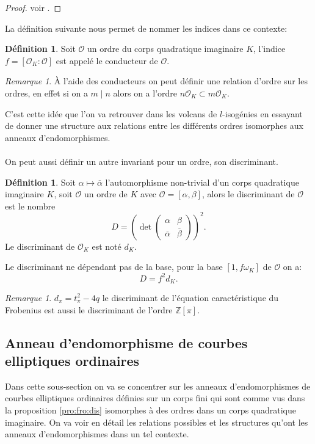 \documentclass[10pt,a4paper]{book}
\theoremstyle{plain}
\theoremstyle{definition}
\theoremstyle{definition}
\theoremstyle{definition}
\theoremstyle{definition}
\newtheorem{defi}[thm]{Définition}
\theoremstyle{remark}
\newtheorem{rem}[thm]{Remarque}
\theoremstyle{remark}
\theoremstyle{definition}
\begin{document}
\begin{proof}
voir \cite[lemma 7.7.2]{Cox89}.
\end{proof}

La définition suivante nous permet de nommer les indices dans ce contexte:
\begin{defi}
Soit $\mathcal{O}$ un ordre du corps quadratique imaginaire $K$, l'indice $f=[\mathcal{O}_K : \mathcal{O}]$ est appelé le conducteur de $\mathcal{O}$.
\end{defi}

\begin{rem}
\`A l'aide des conducteurs on peut définir une relation d'ordre sur les ordres, en effet si on a $m \mid n$ alors on a l'ordre $n\mathcal{O}_K \subset m\mathcal{O}_K$.
\end{rem}

C'est cette idée que l'on va retrouver dans les volcans de $l$-isogénies en essayant de donner une structure aux relations entre les différents ordres isomorphes aux anneaux d'endomorphismes.
\\
\\
On peut aussi définir un autre invariant pour un ordre, son discriminant.

\begin{defi}
Soit $\alpha \mapsto \overline{\alpha}$ l'automorphisme non-trivial d'un corps quadratique imaginaire $K$, soit $\mathcal{O}$ un ordre de $K$ avec $\mathcal{O}=[\alpha, \beta]$, alors le discriminant de $\mathcal{O}$ est le nombre 
\[D= \left( \det \left( 
\begin{array}{cc}
\alpha & \beta\\
\overline{\alpha} & \overline{\beta}
\end{array} 
\right) \right)^2. \]
Le discriminant de $\mathcal{O}_K$ est noté $d_K$.
\end{defi}
Le discriminant ne dépendant pas de la base, pour la base $[1, f \omega_K]$ de $\mathcal{O}$ on a:
\[D=f^2d_K.\]

\begin{rem}
$d_{\pi}=t_{\pi}^2-4q$ le discriminant de l'équation caractéristique du Frobenius est aussi le discriminant de l'ordre $\mathbb{Z}[\pi]$.
\end{rem}



\subsection{Anneau d'endomorphisme de courbes elliptiques ordinaires}
Dans cette sous-section on va se concentrer sur les anneaux d'endomorphismes de courbes elliptiques ordinaires définies sur un corps fini qui sont comme vus dans la proposition \ref{pro:fro:dis} isomorphes à des ordres dans un corps quadratique imaginaire. On va voir en détail les relations possibles et les structures qu'ont les anneaux d'endomorphismes dans un tel contexte.
\end{document}
